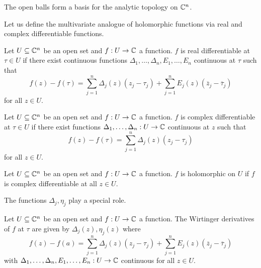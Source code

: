 \begin{remark}
    The open balls form a basis for the analytic topology on $\mathbb{C}^{n}$. 
\end{remark}
Let us define the multivariate analogue of holomorphic functions via real and complex differentiable functions. 
\begin{definition}\label{def: real differentiable}
    Let $U\subseteq\mathbb{C}^{n}$ be an open set and $f:U\to\mathbb{C}$ a function. $f$ is real differentiable at $\tau\in U$ if there exist continuous functions $\Delta_{1},\dots,\Delta_{n},E_{1},\dots,E_{n}$ continuous at $\tau$ such that 
    $$f(z)-f(\tau)=\sum_{j=1}^{n}\Delta_{j}(z)(z_{j}-\tau_{j})+\sum_{j=1}^{n}E_{j}(z)(\overline{z}_{j}-\overline{\tau}_{j})$$
    for all $z\in U$. 
\end{definition}
\begin{definition}\label{def: complex differentiable function}
    Let $U\subseteq\mathbb{C}^{n}$ be an open set and $f:U\to \mathbb{C}$ a function. $f$ is complex differentiable at $\tau\in U$ if there exist functions $\Delta_{1},\dots,\Delta_{n}:U\to\mathbb{C}$ continuous at $z$ such that 
    $$f(z)-f(\tau)=\sum_{j=1}^{n}\Delta_{j}(z)(z_{j}-\tau_{j})$$
    for all $z\in U$. 
\end{definition}
\begin{definition}\label{def: holomorphic function}
    Let $U\subseteq\mathbb{C}^{n}$ be an open set and $f:U\to \mathbb{C}$ a function. $f$ is holomorphic on $U$ if $f$ is complex differentiable at all $z\in U$. 
\end{definition}
The functions $\Delta_{j},\eta_{j}$ play a special role. 
\begin{definition}\label{def: Wirtinger derivatives}
    Let $U\subseteq\mathbb{C}^{n}$ be an open set and $f:U\to \mathbb{C}$ a function. The Wirtinger derivatives of $f$ at $\tau$ are given by $\Delta_{j}(z),\eta_{j}(z)$ where 
    $$f(z)-f(a)=\sum_{j=1}^{n}\Delta_{j}(z)(z_{j}-\tau_{j})+\sum_{j=1}^{n}E_{j}(z)(\overline{z}_{j}-\overline{\tau}_{j})$$
    with $\Delta_{1},\dots,\Delta_{n},E_{1},\dots,E_{n}:U\to\mathbb{C}$ continuous for all $z\in U$.
\end{definition}